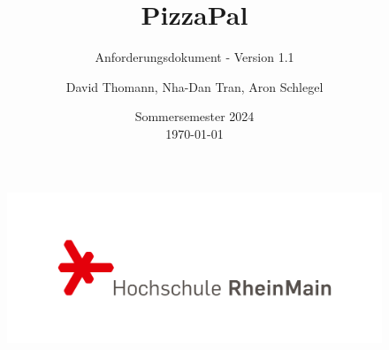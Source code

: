 \documentclass{scrartcl}
\title{PizzaPal}
\subtitle{Anforderungsdokument - Version 1.1}
\author{David Thomann, Nha-Dan Tran, Aron Schlegel}
\date{Sommersemester 2024 \\ \today}
\begin{document}
\maketitle
\thispagestyle{empty}
\begin{figure}[b]
    \centering
    \includegraphics[scale=0.2]{hsrm-logo.png}
\end{figure}
\newpage

\tableofcontents
\newpage









\printglossaries
\end{document}
